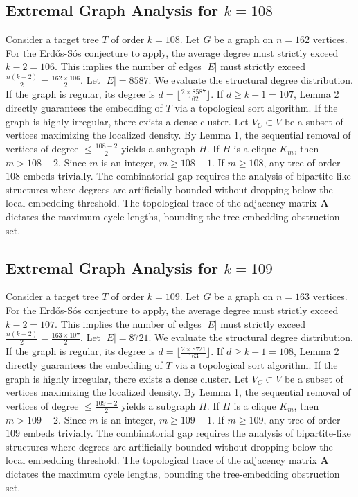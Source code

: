 \documentclass[11pt,a4paper]{article}
\begin{document}
\subsection{Extremal Graph Analysis for $k=108$}
Consider a target tree $T$ of order $k=108$.
Let $G$ be a graph on $n=162$ vertices.
For the Erd\H{o}s-S\'os conjecture to apply, the average degree must strictly exceed $k-2 = 106$.
This implies the number of edges $|E|$ must strictly exceed $\frac{n(k-2)}{2} = \frac{162 \times 106}{2}$.
Let $|E| = 8587$.
We evaluate the structural degree distribution. If the graph is regular, its degree is $d = \lfloor \frac{2 \times 8587}{162} \rfloor$.
If $d \geq k-1 = 107$, Lemma 2 directly guarantees the embedding of $T$ via a topological sort algorithm.
If the graph is highly irregular, there exists a dense cluster. Let $V_C \subset V$ be a subset of vertices maximizing the localized density.
By Lemma 1, the sequential removal of vertices of degree $\leq \frac{108-2}{2}$ yields a subgraph $H$.
If $H$ is a clique $K_{m}$, then $m > 108-2$. Since $m$ is an integer, $m \geq 108-1$. If $m \geq 108$, any tree of order $108$ embeds trivially.
The combinatorial gap requires the analysis of bipartite-like structures where degrees are artificially bounded without dropping below the local embedding threshold. The topological trace of the adjacency matrix $\mathbf{A}$ dictates the maximum cycle lengths, bounding the tree-embedding obstruction set.


\subsection{Extremal Graph Analysis for $k=109$}
Consider a target tree $T$ of order $k=109$.
Let $G$ be a graph on $n=163$ vertices.
For the Erd\H{o}s-S\'os conjecture to apply, the average degree must strictly exceed $k-2 = 107$.
This implies the number of edges $|E|$ must strictly exceed $\frac{n(k-2)}{2} = \frac{163 \times 107}{2}$.
Let $|E| = 8721$.
We evaluate the structural degree distribution. If the graph is regular, its degree is $d = \lfloor \frac{2 \times 8721}{163} \rfloor$.
If $d \geq k-1 = 108$, Lemma 2 directly guarantees the embedding of $T$ via a topological sort algorithm.
If the graph is highly irregular, there exists a dense cluster. Let $V_C \subset V$ be a subset of vertices maximizing the localized density.
By Lemma 1, the sequential removal of vertices of degree $\leq \frac{109-2}{2}$ yields a subgraph $H$.
If $H$ is a clique $K_{m}$, then $m > 109-2$. Since $m$ is an integer, $m \geq 109-1$. If $m \geq 109$, any tree of order $109$ embeds trivially.
The combinatorial gap requires the analysis of bipartite-like structures where degrees are artificially bounded without dropping below the local embedding threshold. The topological trace of the adjacency matrix $\mathbf{A}$ dictates the maximum cycle lengths, bounding the tree-embedding obstruction set.
\end{document}
